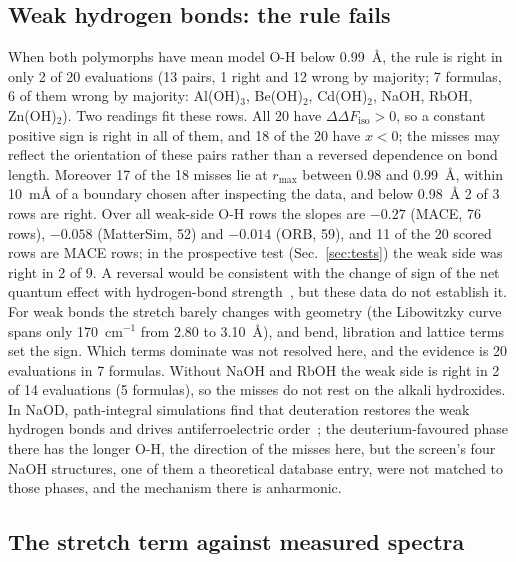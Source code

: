 \documentclass[aps,prmaterials,reprint,superscriptaddress,nofootinbib]{revtex4-2}
\newcommand{\ddF}{\Delta\Delta F_{\mathrm{iso}}}
\begin{document}
\subsection{Weak hydrogen bonds: the rule fails}
\label{sec:weak}

When both polymorphs have mean model O-H below 0.99~\AA, the rule is right in only 2 of 20 evaluations (13 pairs, 1 right and 12 wrong by majority; 7 formulas, 6 of them wrong by majority: Al(OH)$_3$, Be(OH)$_2$, Cd(OH)$_2$, NaOH, RbOH, Zn(OH)$_2$). Two readings fit these rows. All 20 have $\ddF>0$, so a constant positive sign is right in all of them, and 18 of the 20 have $x<0$; the misses may reflect the orientation of these pairs rather than a reversed dependence on bond length. Moreover 17 of the 18 misses lie at $r_{\max}$ between 0.98 and 0.99~\AA, within 10~m\AA{} of a boundary chosen after inspecting the data, and below 0.98~\AA{} 2 of 3 rows are right. Over all weak-side O-H rows the slopes are $-0.27$ (MACE, 76 rows), $-0.058$ (MatterSim, 52) and $-0.014$ (ORB, 59), and 11 of the 20 scored rows are MACE rows; in the prospective test (Sec.~\ref{sec:tests}) the weak side was right in 2 of 9. A reversal would be consistent with the change of sign of the net quantum effect with hydrogen-bond strength~\cite{Li2011,McKenzie2014}, but these data do not establish it. For weak bonds the stretch barely changes with geometry (the Libowitzky curve spans only 170~cm$^{-1}$ from 2.80 to 3.10~\AA), and bend, libration and lattice terms set the sign. Which terms dominate was not resolved here, and the evidence is 20 evaluations in 7 formulas. Without NaOH and RbOH the weak side is right in 2 of 14 evaluations (5 formulas), so the misses do not rest on the alkali hydroxides. In NaOD, path-integral simulations find that deuteration restores the weak hydrogen bonds and drives antiferroelectric order~\cite{Schaack2023}; the deuterium-favoured phase there has the longer O-H, the direction of the misses here, but the screen's four NaOH structures, one of them a theoretical database entry, were not matched to those phases, and the mechanism there is anharmonic.

\subsection{The stretch term against measured spectra}
\label{sec:stretch}
\end{document}
